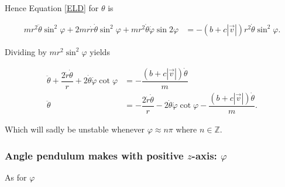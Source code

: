 \documentclass[12pt,a4paper,portrait]{article}
\newcommand{\eq}[1]{Equation \eqref{#1}}
\begin{document}
\begin{landscape}
Hence \eq{ELD} for $\theta$ is

\begin{align*}
	mr^2\ddot{\theta} \sin^2{\varphi} + 2mr\dot{r}\dot{\theta}\sin^2{\varphi} + mr^2\dot{\theta}\dot{\varphi}\sin{2\varphi} &= -(b+c|\vec{v}|)r^2\dot{\theta}\sin^2{\varphi}.
\end{align*}

Dividing by $mr^2\sin^2{\varphi}$ yields

\begin{align*}
	\ddot{\theta} + \dfrac{2\dot{r}\dot{\theta}}{r} + 2\dot{\theta}\dot{\varphi}\cot{\varphi} &= -\dfrac{(b+c|\vec{v}|)\dot{\theta}}{m} \\
	\ddot{\theta} &= -\dfrac{2\dot{r}\dot{\theta}}{r} - 2\dot{\theta}\dot{\varphi}\cot{\varphi} -\dfrac{(b+c|\vec{v}|)\dot{\theta}}{m}.
\end{align*}

Which will sadly be unstable whenever $\varphi \approx n\pi$ where $n\in \mathbb{Z}$.

\subsubsection{Angle pendulum makes with positive $z$-axis: $\varphi$}
As for $\varphi$


\end{landscape}
\end{document}
